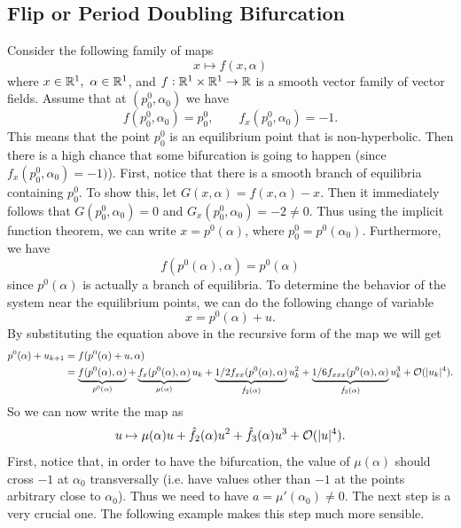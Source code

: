 \subsection{Flip or Period Doubling Bifurcation}
Consider the following family of maps
\[ x \mapsto f(x,\alpha) \]
where $x \in \mathbb{R}^1,\ \alpha \in \mathbb{R}^1$, and $f: \mathbb{R}^1\times\mathbb{R}^1 \to \mathbb{R}$ is a smooth vector family of vector fields. Assume that at $(p^0_0, \alpha_0)$ we have
\[ f(p_0^0, \alpha_0) = p_0^0, \qquad f_x(p_0^0, \alpha_0) = -1. \]
This means that the point $p_0^0$ is an equilibrium point that is non-hyperbolic. Then there is a high chance that some bifurcation is going to happen (since $f_x(p^0_0,\alpha_0)=-1)$). First, notice that there is a smooth branch of equilibria containing $p_0^0$. To show this, let $G(x,\alpha) = f(x,\alpha) - x$. Then it immediately follows that $G(p_0^0, \alpha_0) = 0$ and $G_x(p_0^0,\alpha_0) = -2 \neq 0$. Thus using the implicit function theorem, we can write $x = p^0(\alpha)$, where $p_0^0 = p^0(\alpha_0)$. Furthermore, we have
\[ f(p^0(\alpha),\alpha) = p^0(\alpha) \]
since $p^0(\alpha)$ is actually a branch of equilibria. To determine the behavior of the system near the equilibrium points, we can do the following change of variable
\[ x = p^0(\alpha) + u. \]
By substituting the equation above in the recursive form of the map we will get
\begin{align*}
	p^0(\alpha) + u_{k+1} &= f(p^0(\alpha)+u,\alpha) \\
	&= \underbrace{f(p^0(\alpha),\alpha)}_{p^0(\alpha)} + \underbrace{f_x(p^0(\alpha),\alpha)}_{\mu(\alpha)}u_k + \underbrace{1/2f_{xx}(p^0(\alpha),\alpha)}_{\hat{f}_2(\alpha)}u_k^2 + \underbrace{1/6f_{xxx}(p^0(\alpha),\alpha)}_{\hat{f}_3(\alpha)}u_k^3 + \mathcal{O}(|u_k|^4).
\end{align*}
So we can now write the map as
\[ u \mapsto \mu(\alpha)u + \hat{f}_2(\alpha)u^2 + \hat{f}_3(\alpha)u^3 + \mathcal{O}(|u|^4). \]
First, notice that, in order to have the bifurcation, the value of $\mu(\alpha)$ should cross $-1$ at $\alpha_0$ transversally (i.e. have values other than $-1$ at the points arbitrary close to $\alpha_0$). Thus we need to have $a = \mu'(\alpha_0) \neq 0$. The next step is a very crucial one. The following example makes this step much more sensible.

